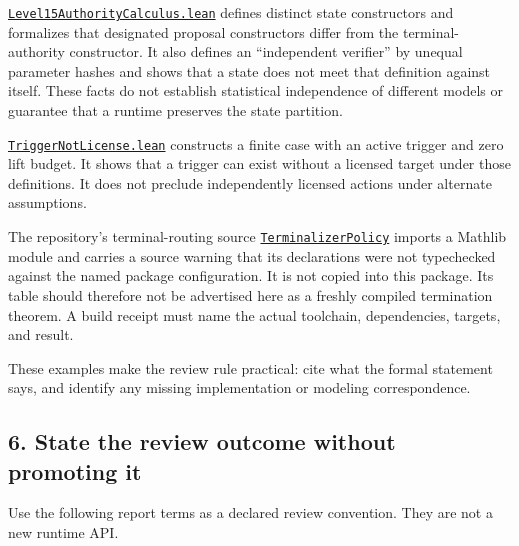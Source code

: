 \documentclass[
  11pt,
]{article}
\newcommand{\passthrough}[1]{#1}
\begin{document}
\href{https://github.com/dbccpage/the_symbol_game/blob/52cb5457f6c485ba548cfd292f6012a941ed22cf/atlas/coda_atlas/symbol_game/009_pfp_adversarial_dialectics_and_terminal_reality_gates/lean4/Level15AuthorityCalculus.lean}{\mbox{\nolinkurl{Level15AuthorityCalculus.lean}}}
defines distinct state constructors and formalizes that designated
proposal constructors differ from the terminal-authority constructor. It
also defines an ``independent verifier'' by unequal parameter hashes and
shows that a state does not meet that definition against itself. These
facts do not establish statistical independence of different models or
guarantee that a runtime preserves the state partition.

\href{https://github.com/dbccpage/the_symbol_game/blob/52cb5457f6c485ba548cfd292f6012a941ed22cf/atlas/coda_atlas/symbol_game/009_pfp_adversarial_dialectics_and_terminal_reality_gates/lean4/TriggerNotLicense.lean}{\mbox{\nolinkurl{TriggerNotLicense.lean}}}
constructs a finite case with an active trigger and zero lift budget. It
shows that a trigger can exist without a licensed target under those
definitions. It does not preclude independently licensed actions under
alternate assumptions.

The repository's terminal-routing source
\href{https://github.com/dbccpage/the_symbol_game/blob/52cb5457f6c485ba548cfd292f6012a941ed22cf/lean4/TerminalizerPolicy.lean}{\passthrough{\lstinline!TerminalizerPolicy!}}
imports a Mathlib module and carries a source warning that its
declarations were not typechecked against the named package
configuration. It is not copied into this package. Its table should
therefore not be advertised here as a freshly compiled termination
theorem. A build receipt must name the actual toolchain, dependencies,
targets, and result.

These examples make the review rule practical: cite what the formal
statement says, and identify any missing implementation or modeling
correspondence.

\subsection{6. State the review outcome without promoting
it}\label{state-the-review-outcome-without-promoting-it}

Use the following report terms as a declared review convention. They are
not a new runtime API.
\end{document}
